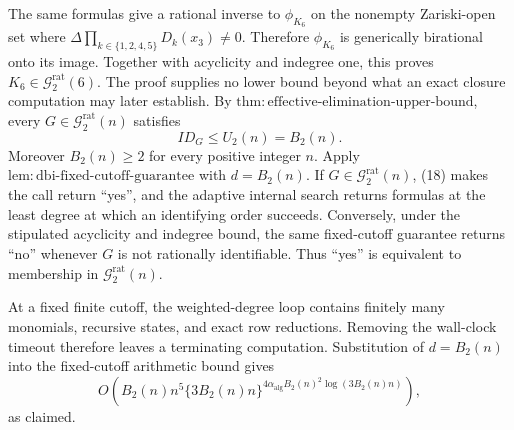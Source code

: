 The same formulas give a rational inverse to \(\phi_{K_6}\) on the nonempty Zariski-open set where \(\Delta\prod_{k\in\{1,2,4,5\}}D_k(x_3)\neq0\).  Therefore \(\phi_{K_6}\) is generically birational onto its image.  Together with acyclicity and indegree one, this proves \(K_6\in\mathcal G_{2}^{\mathrm{rat}}(6)\).  The proof supplies no lower bound beyond what an exact closure computation may later establish.
By \(\mathrm{thm:effective\mbox{-}elimination\mbox{-}upper\mbox{-}bound}\), every \(G\in\mathcal G_{2}^{\mathrm{rat}}(n)\) satisfies
\[
 ID_G\leq U_2(n)=B_2(n). \tag{18}
\]
Moreover \(B_2(n)\geq2\) for every positive integer \(n\).  Apply \(\mathrm{lem:dbi\mbox{-}fixed\mbox{-}cutoff\mbox{-}guarantee}\) with \(d=B_2(n)\).  If \(G\in\mathcal G_{2}^{\mathrm{rat}}(n)\), (18) makes the call return ``yes'', and the adaptive internal search returns formulas at the least degree at which an identifying order succeeds.  Conversely, under the stipulated acyclicity and indegree bound, the same fixed-cutoff guarantee returns ``no'' whenever \(G\) is not rationally identifiable.  Thus ``yes'' is equivalent to membership in \(\mathcal G_{2}^{\mathrm{rat}}(n)\).

At a fixed finite cutoff, the weighted-degree loop contains finitely many monomials, recursive states, and exact row reductions.  Removing the wall-clock timeout therefore leaves a terminating computation.  Substitution of \(d=B_2(n)\) into the fixed-cutoff arithmetic bound gives
\[
 O\!\left(B_2(n)n^5\{3B_2(n)n\}^{4\alpha_{\mathrm{alg}}B_2(n)^2\log(3B_2(n)n)}\right),
\]
as claimed.

